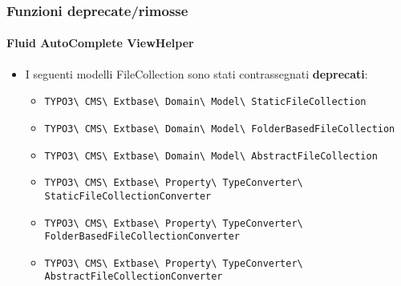 \begin{frame}[fragile]
	\frametitle{Funzioni deprecate/rimosse}
	\framesubtitle{Fluid AutoComplete ViewHelper}

	\begin{itemize}
		\item I seguenti modelli FileCollection sono stati contrassegnati \textbf{deprecati}:
			\vspace{0.4cm}
			\begin{itemize}\tiny
				\item \texttt{TYPO3\textbackslash
					CMS\textbackslash
					Extbase\textbackslash
					Domain\textbackslash
					Model\textbackslash
					StaticFileCollection}

				\item \texttt{TYPO3\textbackslash
					CMS\textbackslash
					Extbase\textbackslash
					Domain\textbackslash
					Model\textbackslash
					FolderBasedFileCollection}

				\item \texttt{TYPO3\textbackslash
					CMS\textbackslash
					Extbase\textbackslash
					Domain\textbackslash
					Model\textbackslash
					AbstractFileCollection}

				\item \texttt{TYPO3\textbackslash
					CMS\textbackslash
					Extbase\textbackslash
					Property\textbackslash
					TypeConverter\textbackslash
					StaticFileCollectionConverter}

				\item \texttt{TYPO3\textbackslash
					CMS\textbackslash
					Extbase\textbackslash
					Property\textbackslash
					TypeConverter\textbackslash
					FolderBasedFileCollectionConverter}

				\item \texttt{TYPO3\textbackslash
					CMS\textbackslash
					Extbase\textbackslash
					Property\textbackslash
					TypeConverter\textbackslash
					AbstractFileCollectionConverter}

			\end{itemize}

	\end{itemize}

\end{frame}


